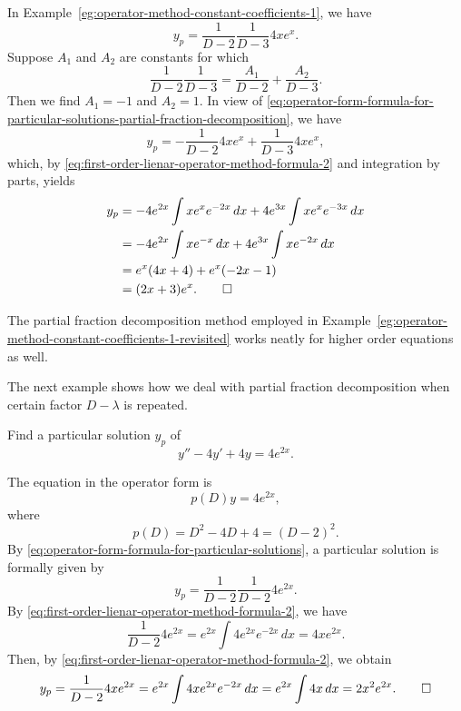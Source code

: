 \begin{solution}
	In Example~\ref{eg:operator-method-constant-coefficients-1}, we have
	\[y_p = \frac{1}{D-2}\frac{1}{D-3} 4xe^x.\]
	Suppose $A_1$ and $A_2$ are constants for which \[\frac{1}{D-2}\frac{1}{D-3} = \frac{A_1}{D-2}+\frac{A_2}{D-3}.\]
	Then we find $A_1= -1$ and $A_2= 1.$  In view of \eqref{eq:operator-form-formula-for-particular-solutions-partial-fraction-decomposition}, we have
	\[y_p=-\frac{1}{D-2} 4xe^x+ \frac{1}{D-3}4xe^x,\] which, by \eqref{eq:first-order-lienar-operator-method-formula-2} and integration by parts, yields
	\[\begin{split}
		y_p &= -4e^{2x} \int xe^x e^{-2x}\, dx + 4e^{3x} \int xe^x e^{-3x}\, dx\\
		&= -4e^{2x} \int x e^{-x}\, dx + 4e^{3x} \int x e^{-2x}\, dx\\
		&=e^x(4x+4)+e^x(-2x-1)\\
		&=(2x+3)e^x.\qedhere
	\end{split}\]
\end{solution}
The partial fraction decomposition method employed in Example~\ref{eg:operator-method-constant-coefficients-1-revisited} works neatly for higher order equations as well.

The next example shows how we deal with partial fraction decomposition when certain factor $D-\lambda$ is repeated. 
\begin{example}\label{eg:operator-method-constant-coefficients-3}
	Find a particular solution $y_p$ of 
	\[y''-4y'+4y= 4e^{2x}.\]
\end{example}
\begin{solution}
	The equation in the operator form is 
\begin{equation*}
	p(D)y =4e^{2x},
\end{equation*}where 
\[p(D)= D^2-4D+4=(D-2)^2.\] By \eqref{eq:operator-form-formula-for-particular-solutions}, a particular solution is formally given by 
\[y_p = \frac{1}{D-2}\frac{1}{D-2} 4e^{2x}.\]
By \eqref{eq:first-order-lienar-operator-method-formula-2}, we have
\[\frac{1}{D-2} 4e^{2x} = e^{2x}\int4e^{2x}e^{-2x}\, dx=4xe^{2x}.\] Then, by  \eqref{eq:first-order-lienar-operator-method-formula-2}, we obtain
\[y_p = \frac{1}{D-2}4xe^{2x} =e^{2x}\int4xe^{2x}e^{-2x}\, dx = e^{2x}\int4x\, dx = 2x^2e^{2x}.\qedhere\]
\end{solution}

